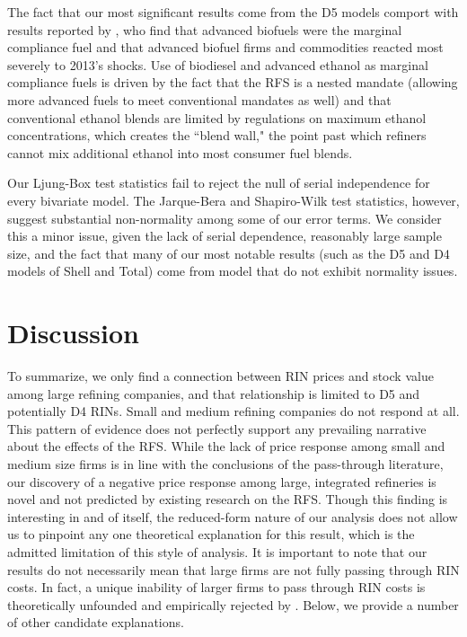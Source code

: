 \documentclass[11pt]{article}
\begin{document}
The fact that our most significant results come from the D5 models comport with results reported by \cite{Lade2018a}, who find that advanced biofuels were the marginal compliance fuel and that advanced biofuel firms and commodities reacted most severely to 2013's shocks. Use of biodiesel and advanced ethanol as marginal compliance fuels is driven by the fact that the RFS is a nested mandate (allowing more advanced fuels to meet conventional mandates as well) and that conventional ethanol blends are limited by regulations on maximum ethanol concentrations, which creates the ``blend wall," the point past which refiners cannot mix additional ethanol into most consumer fuel blends.

Our Ljung-Box test statistics fail to reject the null of serial independence for every bivariate model. The Jarque-Bera and Shapiro-Wilk test statistics, however, suggest substantial non-normality among some of our error terms. We consider this a minor issue, given the lack of serial dependence, reasonably large sample size, and the fact that many of our most notable results (such as the D5 and D4 models of Shell and Total) come from model that do not exhibit normality issues.

\section{Discussion}

To summarize, we only find a connection between RIN prices and stock value among large refining companies, and that relationship is limited to D5 and potentially D4 RINs. Small and medium refining companies do not respond at all. This pattern of evidence does not perfectly support any prevailing narrative about the effects of the RFS. While the lack of price response among small and medium size firms is in line with the conclusions of the pass-through literature, our discovery of a negative price response among large, integrated refineries is novel and not predicted by existing research on the RFS. Though this finding is interesting in and of itself, the reduced-form nature of our analysis does not allow us to pinpoint any one theoretical explanation for this result, which is the admitted limitation of this style of analysis. It is important to note that our results do not necessarily mean that large firms are not fully passing through RIN costs. In fact, a unique inability of larger firms to pass through RIN costs is theoretically unfounded and empirically rejected by \cite{Burkhardt2019}. Below, we provide a number of other candidate explanations.
\end{document}
